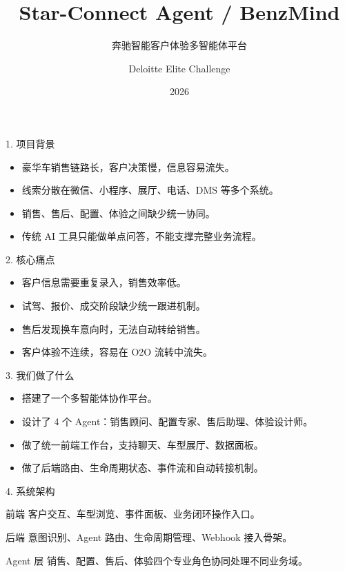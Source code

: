 \documentclass[aspectratio=169,12pt]{beamer}
\title[Star-Connect Agent]{Star-Connect Agent / BenzMind}
\subtitle{奔驰智能客户体验多智能体平台}
\author{Deloitte Elite Challenge}
\date{2026}
\begin{document}
\begin{frame}
  \titlepage
\end{frame}

\begin{frame}{1. 项目背景}
\begin{itemize}
  \item 豪华车销售链路长，客户决策慢，信息容易流失。
  \item 线索分散在微信、小程序、展厅、电话、DMS 等多个系统。
  \item 销售、售后、配置、体验之间缺少统一协同。
  \item 传统 AI 工具只能做单点问答，不能支撑完整业务流程。
\end{itemize}
\end{frame}

\begin{frame}{2. 核心痛点}
\begin{itemize}
  \item 客户信息需要重复录入，销售效率低。
  \item 试驾、报价、成交阶段缺少统一跟进机制。
  \item 售后发现换车意向时，无法自动转给销售。
  \item 客户体验不连续，容易在 O2O 流转中流失。
\end{itemize}
\end{frame}

\begin{frame}{3. 我们做了什么}
\begin{itemize}
  \item 搭建了一个多智能体协作平台。
  \item 设计了 4 个 Agent：销售顾问、配置专家、售后助理、体验设计师。
  \item 做了统一前端工作台，支持聊天、车型展厅、数据面板。
  \item 做了后端路由、生命周期状态、事件流和自动转接机制。
\end{itemize}
\end{frame}

\begin{frame}{4. 系统架构}
\begin{block}{前端}
客户交互、车型浏览、事件面板、业务闭环操作入口。
\end{block}
\begin{block}{后端}
意图识别、Agent 路由、生命周期管理、Webhook 接入骨架。
\end{block}
\begin{block}{Agent 层}
销售、配置、售后、体验四个专业角色协同处理不同业务域。
\end{block}
\end{frame}
\end{document}
